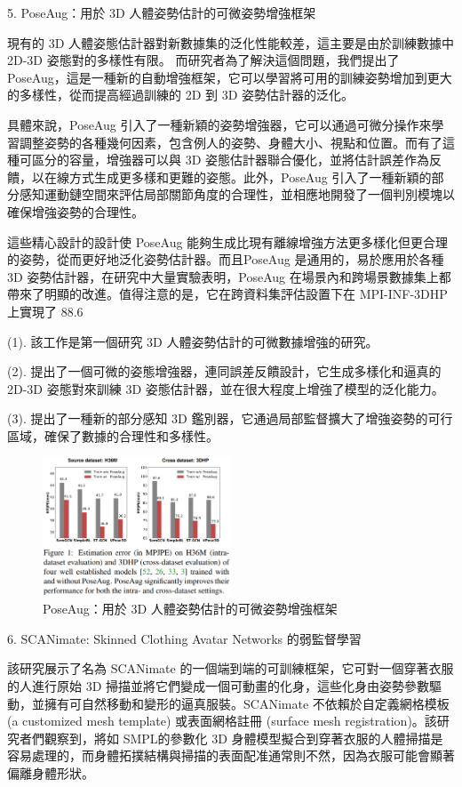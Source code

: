 \documentclass[10pt,UTF8]{ctexart}
\begin{document}
5. PoseAug：用於 3D 人體姿勢估計的可微姿勢增強框架

現有的 3D 人體姿態估計器對新數據集的泛化性能較差，這主要是由於訓練數據中 2D-3D 姿態對的多樣性有限。	而研究者為了解決這個問題，我們提出了 PoseAug，這是一種新的自動增強框架，它可以學習將可用的訓練姿勢增加到更大的多樣性，從而提高經過訓練的 2D 到 3D 姿勢估計器的泛化。

具體來說，PoseAug 引入了一種新穎的姿勢增強器，它可以通過可微分操作來學習調整姿勢的各種幾何因素，包含例人的姿勢、身體大小、視點和位置。而有了這種可區分的容量，增強器可以與 3D 姿態估計器聯合優化，並將估計誤差作為反饋，以在線方式生成更多樣和更難的姿態。此外，PoseAug 引入了一種新穎的部分感知運動鏈空間來評估局部關節角度的合理性，並相應地開發了一個判別模塊以確保增強姿勢的合理性。

這些精心設計的設計使 PoseAug 能夠生成比現有離線增強方法更多樣化但更合理的姿勢，從而更好地泛化姿勢估計器。而且PoseAug 是通用的，易於應用於各種 3D 姿勢估計器，在研究中大量實驗表明，PoseAug 在場景內和跨場景數據集上都帶來了明顯的改進。值得注意的是，它在跨資料集評估設置下在 MPI-INF-3DHP 上實現了 88.6%

(1). 該工作是第一個研究 3D 人體姿勢估計的可微數據增強的研究。

(2). 提出了一個可微的姿態增強器，連同誤差反饋設計，它生成多樣化和逼真的 2D-3D 姿態對來訓練 3D 姿態估計器，並在很大程度上增強了模型的泛化能力。

(3). 提出了一種新的部分感知 3D 鑑別器，它通過局部監督擴大了增強姿勢的可行區域，確保了數據的合理性和多樣性。

\begin{figure}[H]
\centering 
\includegraphics[width=0.50\textwidth]{r5.png} 
\caption{PoseAug：用於 3D 人體姿勢估計的可微姿勢增強框架}
\label{Test}
\end{figure}

6. SCANimate: Skinned Clothing Avatar Networks 的弱監督學習

該研究展示了名為 SCANimate 的一個端到端的可訓練框架，它可對一個穿著衣服的人進行原始 3D 掃描並將它們變成一個可動畫的化身，這些化身由姿勢參數驅動，並擁有可自然移動和變形的逼真服裝。SCANimate 不依賴於自定義網格模板 (a customized mesh template) 或表面網格註冊 (surface mesh registration)。該研究者們觀察到，將如 SMPL的參數化 3D 身體模型擬合到穿著衣服的人體掃描是容易處理的，而身體拓撲結構與掃描的表面配准通常則不然，因為衣服可能會顯著偏離身體形狀。
\end{document}
